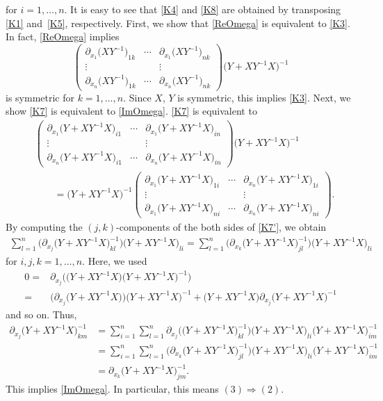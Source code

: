 \documentclass[pdftex]{sigma}
\numberwithin{equation}{section}
\begin{document}
for $i=1,\ldots ,n$. It is easy to see that \eqref{K4} and \eqref{K8} are obtained by transposing \eqref{K1} and~\eqref{K5}, respectively. First, we show that \eqref{ReOmega} is equivalent to \eqref{K3}. In fact, \eqref{ReOmega} implies
\[
\begin{pmatrix}
\partial_{x_1}\bigl(XY^{-1}\bigr)_{1k} & \cdots & \partial_{x_1}\bigl(XY^{-1}\bigr)_{nk} \\
\vdots & & \vdots \\
\partial_{x_n}\bigl(XY^{-1}\bigr)_{1k} & \cdots & \partial_{x_n}\bigl(XY^{-1}\bigr)_{nk}
\end{pmatrix}
\bigl(Y+XY^{-1}X\bigr)^{-1}
\]
is symmetric for $k=1,\ldots , n$. Since $X$, $Y$ is symmetric, this implies \eqref{K3}. Next, we show \eqref{K7} is equivalent to \eqref{ImOmega}. \eqref{K7} is equivalent to
\begin{align}
&\begin{pmatrix}
\partial_{x_1}\bigl(Y+XY^{-1}X\bigr)_{i1} & \cdots & \partial_{x_1}\bigl(Y+XY^{-1}X\bigr)_{in} \\
\vdots & & \vdots \\
\partial_{x_n}\bigl(Y+XY^{-1}X\bigr)_{i1} & \cdots & \partial_{x_n}\bigl(Y+XY^{-1}X\bigr)_{in}
\end{pmatrix}
\bigl(Y+XY^{-1}X\bigr)^{-1}\nonumber\\
&\qquad=\bigl(Y+XY^{-1}X\bigr)^{-1}
\begin{pmatrix}
\partial_{x_1}\bigl(Y+XY^{-1}X\bigr)_{1i} & \cdots & \partial_{x_n}\bigl(Y+XY^{-1}X\bigr)_{1i} \\
\vdots & & \vdots \\
\partial_{x_1}\bigl(Y+XY^{-1}X\bigr)_{ni} & \cdots & \partial_{x_n}\bigl(Y+XY^{-1}X\bigr)_{ni}
\end{pmatrix}.\label{K7'}
\end{align}
By computing the $(j, k)$-components of the both sides of \eqref{K7'}, we obtain
\begin{gather*}
\sum_{l=1}^n\bigl(\partial_{x_j}\bigl(Y+XY^{-1}X\bigr)^{-1}_{kl}\bigr)\bigl(Y+XY^{-1}X\bigr)_{li}=\sum_{l=1}^n\bigl(\partial_{x_k}\bigl(Y+XY^{-1}X\bigr)^{-1}_{jl}\bigr)\bigl(Y+XY^{-1}X\bigr)_{li}
\end{gather*}
for $i, j, k=1,\ldots , n$. Here, we used
\begin{align*}
0={}&\partial_{x_j}\bigl(\bigl(Y+XY^{-1}X\bigr)\bigl(Y+XY^{-1}X\bigr)^{-1}\bigr) \\
={}&\bigl(\partial_{x_j}\bigl(Y+XY^{-1}X\bigr)\bigr)\bigl(Y+XY^{-1}X\bigr)^{-1}+\bigl(Y+XY^{-1}X\bigr)\partial_{x_j}\bigl(Y+XY^{-1}X\bigr)^{-1}
\end{align*}
and so on. Thus,
\begin{align*}
\partial_{x_j}\bigl(Y+XY^{-1}X\bigr)^{-1}_{km}&=\sum_{i=1}^n\sum_{l=1}^n\partial_{x_j}\bigl(\bigl(Y+XY^{-1}X\bigr)^{-1}_{kl}\bigr)\bigl(Y+XY^{-1}X\bigr)_{li}\bigl(Y+XY^{-1}X\bigr)^{-1}_{im} \\
&=\sum_{i=1}^n\sum_{l=1}^n\bigl(\partial_{x_k}\bigl(Y+XY^{-1}X\bigr)^{-1}_{jl}\bigr)\bigl(Y+XY^{-1}X\bigr)_{li}\bigl(Y+XY^{-1}X\bigr)^{-1}_{im} \\
&=\partial_{x_k}\bigl(Y+XY^{-1}X\bigr)^{-1}_{jm}.
\end{align*}
This implies \eqref{ImOmega}. In particular, this means $(3)\Rightarrow (2)$.
\end{document}
